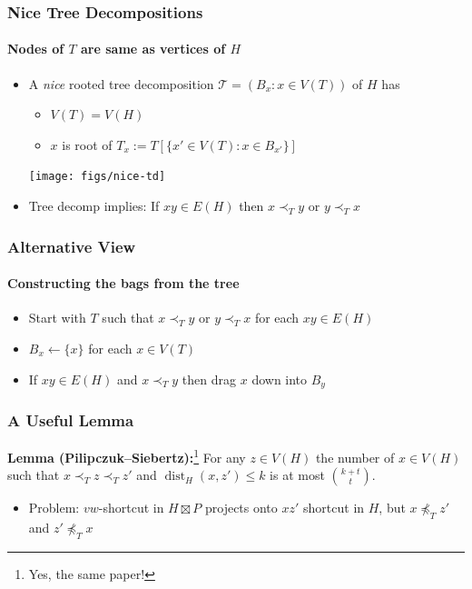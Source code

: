 \documentclass[xcolor=dvipsnames]{beamer}
\begin{document}
\begin{frame}
  \frametitle{Nice Tree Decompositions}
  \framesubtitle{Nodes of $T$ are same as vertices of $H$}

  \begin{itemize}
    \item A \emph{nice} rooted tree decomposition $\mathcal{T}=(B_x:x\in V(T))$ of $H$ has
    \begin{itemize}
      \item $V(T) = V(H)$
      \item $x$ is root of $T_x:=T[\{x'\in V(T):x\in B_{x'}\}]$
    \end{itemize}
    \begin{center}
      \texttt{[image: figs/nice-td]}
    \end{center}
    \item<2-> Tree decomp implies: If $xy\in E(H)$ then $x\prec_T y$ or $y\prec_T x$
  \end{itemize}
\end{frame}


\begin{frame}
  \frametitle{Alternative View}
  \framesubtitle{Constructing the bags from the tree}
  
  \begin{itemize}
    \item<1-> Start with $T$ such that $x\prec_T y$ or $y\prec_T x$ for each $xy\in E(H)$
    \item<2-> $B_x\gets\{x\}$ for each $x\in V(T)$
    \item<3-> If $xy\in E(H)$ and $x\prec_T y$ then drag $x$ down into $B_y$
  \end{itemize}
  \begin{center}
  \end{center}
\end{frame}


\begin{frame}
  \frametitle{A Useful Lemma}

  \textbf{Lemma (Pilipczuk--Siebertz):}\footnote{Yes, the same paper!} For any $z\in V(H)$ the number of $x\in V(H)$ such that $x\prec_T z\prec_T z'$ and $\mathop{dist}_H(x,z')\le k$ is at most $\binom{k+t}{t}$.
  \begin{center}
  \end{center}
  \begin{itemize}
      \item<2->Problem: $vw$-shortcut in $H\boxtimes P$ projects onto $xz'$ shortcut in $H$, but $x\not\preceq_T z'$ and $z'\not\preceq_T x$
  \end{itemize}
\end{frame}
\end{document}
